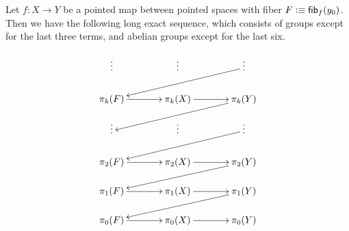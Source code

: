 \begin{thm}\label{thm:les}
  Let $f:X \to Y$ be a pointed map between pointed spaces with fiber $F\vcentcolon\equiv {\mathsf{fib}}_{f}(y_0)$.
  Then we have the following long exact sequence, which consists of groups except for the last three terms, and abelian groups except for the last six.

  \[
  \xymatrix@R=1.2pc@C=3pc{
    \vdots & \vdots & \vdots \ar[lld] \\
    \pi_k(F) \ar[r] & \pi_k(X) \ar[r] & \pi_k(Y) \ar[lld] \\
    \vdots & \vdots & \vdots \ar[lld] \\
    \pi_2(F) \ar[r] & \pi_2(X) \ar[r] & \pi_2(Y) \ar[lld] \\
    \pi_1(F) \ar[r] & \pi_1(X) \ar[r] & \pi_1(Y) \ar[lld]\\
    \pi_0(F) \ar[r] & \pi_0(X) \ar[r] & \pi_0(Y)}
  \]
\end{thm}

\vspace*{0pt plus 10ex}
\goodbreak

